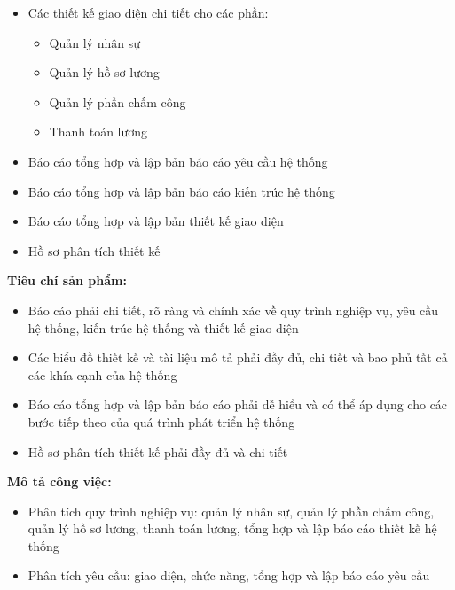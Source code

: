 {\begin{minipage}{\textwidth}
\begin{itemize}
\begin{itemize}
            \item Nhân sự
            \item Hồ sơ lương
            \item Phần chấm công
            \item Thanh toán lương
        \end{itemize}
        \item Các thiết kế giao diện chi tiết cho các phần:
        \begin{itemize}
            \item Quản lý nhân sự
            \item Quản lý hồ sơ lương
            \item Quản lý phần chấm công
            \item Thanh toán lương
        \end{itemize}
        \item Báo cáo tổng hợp và lập bản báo cáo yêu cầu hệ thống
        \item Báo cáo tổng hợp và lập bản báo cáo kiến trúc hệ thống
        \item Báo cáo tổng hợp và lập bản thiết kế giao diện
        \item Hồ sơ phân tích thiết kế
    \end{itemize}
    \vspace{0.5cm}
    \noindent \textbf{Tiêu chí sản phẩm:}
    \begin{itemize}
        \item Báo cáo phải chi tiết, rõ ràng và chính xác về quy trình nghiệp vụ, yêu cầu hệ thống, kiến trúc hệ thống và thiết kế giao diện
        \item Các biểu đồ thiết kế và tài liệu mô tả phải đầy đủ, chi tiết và bao phủ tất cả các khía cạnh của hệ thống
        \item Báo cáo tổng hợp và lập bản báo cáo phải dễ hiểu và có thể áp dụng cho các bước tiếp theo của quá trình phát triển hệ thống
        \item Hồ sơ phân tích thiết kế phải đầy đủ và chi tiết
    \end{itemize}
    \vspace{0.5cm}
    \noindent \textbf{Mô tả công việc:}
    \begin{itemize}
        \item Phân tích quy trình nghiệp vụ: quản lý nhân sự, quản lý phần chấm công, quản lý hồ sơ lương, thanh toán lương, tổng hợp và lập báo cáo thiết kế hệ thống
        \item Phân tích yêu cầu: giao diện, chức năng, tổng hợp và lập báo cáo yêu cầu

\end{itemize}
\end{minipage}}
